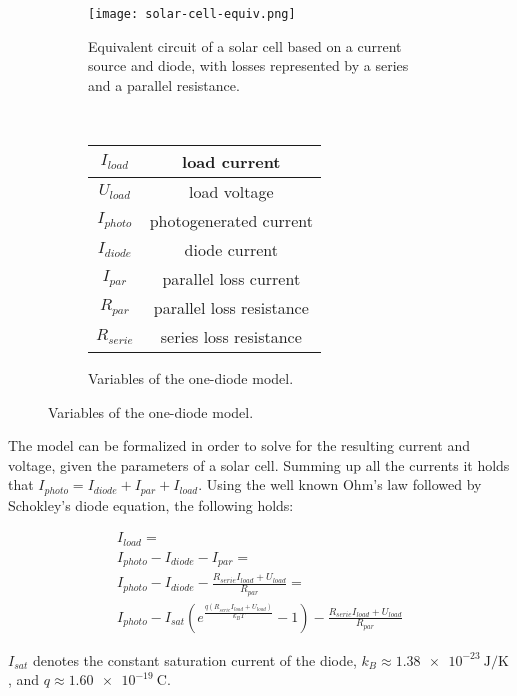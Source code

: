 \begin{figure}[!ht]
\centering
\begin{subfigure}{0.4\textwidth}
  \texttt{[image: solar-cell-equiv.png]}
  \caption[Equivalent circuit of a solar cell]{
    Equivalent circuit of a solar cell based on a current source and diode,
    with losses represented by a series and a parallel resistance.
  }
  \label{fig:solar-cell-equiv}
\end{subfigure}
~
\begin{subfigure}{0.4\textwidth}
  \begin{tabular}[b]{| c | c |}
  \hline
  $I_{load}$ & load current \\ \hline
  $U_{load}$ & load voltage\\ \hline
  $I_{photo}$ & photogenerated current \\ \hline
  $I_{diode}$ & diode current \\ \hline
  $I_{par}$ & parallel loss current \\ \hline
  $R_{par}$ & parallel loss resistance \\ \hline
  $R_{serie}$ & series loss resistance \\ \hline
  \end{tabular}
  \caption[solar-cell-variables]{Variables of the one-diode model.}
  \label{fig:one-diode-model-vars}
\end{subfigure}
\end{figure}

The model can be formalized in order to solve for the resulting current and voltage, given the parameters of a solar cell.
Summing up all the currents it holds that $I_{photo} = I_{diode} + I_{par} + I_{load}$.
Using the well known Ohm's law followed by Schokley's diode equation\cite{Walker2001}, the following holds:

\begin{multline}
\label{eq:eq-circuit}
I_{load} = \\
I_{photo} - I_{diode} - I_{par} = \\
I_{photo} - I_{diode} - \frac{R_{serie}I_{load} + U_{load}}{R_{par}} = \\
I_{photo} - I_{sat}(e^\frac{q(R_{serie}I_{load} + U_{load})}{k_B T} - 1) - \frac{R_{serie}I_{load} + U_{load}}{R_{par}}
\end{multline}

$I_{sat}$ denotes the constant saturation current of the diode,
$k_B \approx \SI{1.38e-23}{\joule\per\kelvin}$,
and $q \approx \SI{1.60e-19}{\coulomb}$.

